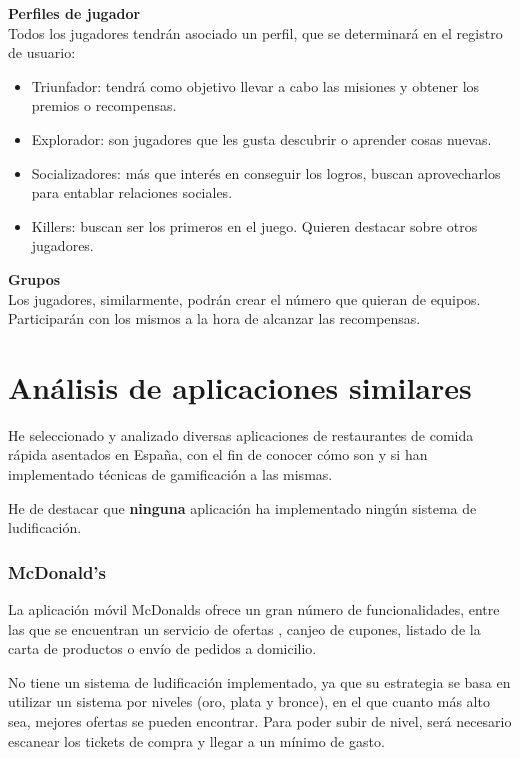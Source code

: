 \documentclass[twoside]{report}
\begin{document}
\textbf{Perfiles de jugador\cite{iebsctj}}\\ 

Todos los jugadores tendrán asociado un perfil, que se determinará en el registro de usuario:
\begin{itemize}

\item Triunfador: tendrá como objetivo llevar a cabo las misiones y obtener los premios o recompensas.
\item Explorador: son jugadores que les gusta descubrir o aprender cosas nuevas.
\item Socializadores: más que interés en conseguir los logros, buscan aprovecharlos para entablar relaciones sociales.
\item Killers: buscan ser los primeros en el juego. Quieren destacar sobre otros jugadores.

\end{itemize}

\textbf{Grupos}\\

Los jugadores, similarmente, podrán crear el número que quieran de equipos. Participarán con los mismos a la hora de alcanzar las recompensas.

\section{Análisis de aplicaciones similares}

He seleccionado y analizado diversas aplicaciones de restaurantes de comida rápida asentados en España, con el fin de conocer cómo son y si han implementado técnicas de gamificación a las mismas.

He de destacar que \textbf{ninguna} aplicación ha implementado ningún sistema de ludificación.

\subsubsection{McDonald's \cite{mcdo}}

La aplicación móvil McDonalds ofrece un gran número de funcionalidades, entre las que se encuentran un servicio de ofertas , canjeo de cupones, listado de la carta de productos o envío de pedidos a domicilio. 

No tiene un sistema de ludificación implementado, ya que su estrategia se basa en utilizar un sistema por niveles (oro, plata y bronce), en el que cuanto más alto sea, mejores ofertas se pueden encontrar. Para poder subir de nivel, será necesario escanear los tickets de compra y llegar a un mínimo de gasto.
\end{document}

